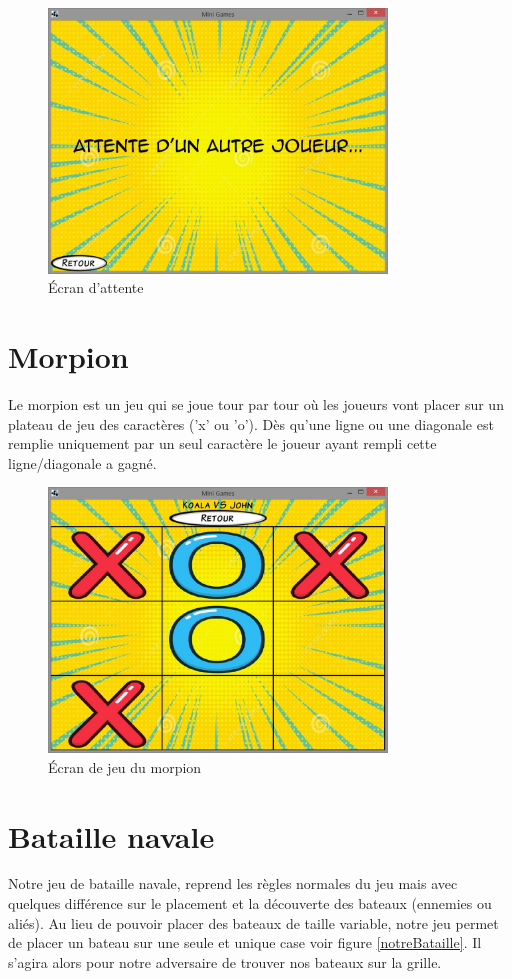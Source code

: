 \documentclass{report}
\begin{document}
\begin{figure}[H]
	\centering\includegraphics[width=9cm]{morpionwaiting}
	\caption{Écran d'attente}
\end{figure}

\chapter{Morpion}
Le morpion est un jeu qui se joue tour par tour où les joueurs vont placer sur un
plateau de jeu des caractères ('x' ou 'o'). Dès qu'une ligne ou une diagonale est remplie uniquement par un seul caractère
le joueur ayant rempli cette ligne/diagonale a gagné.

\begin{figure}[H]
	\centering\includegraphics[width=9cm]{morpioningame}
	\caption{Écran de jeu du morpion}
\end{figure}


\chapter{Bataille navale}
Notre jeu de bataille navale, reprend les règles normales du jeu mais avec quelques différence sur le placement et la découverte des bateaux (ennemies ou aliés). Au lieu de pouvoir placer
des bateaux de taille variable, notre jeu permet de placer un bateau sur une seule et unique case
voir figure \ref{notreBataille}. Il s'agira alors pour notre adversaire de trouver nos bateaux sur la grille.
\end{document}
